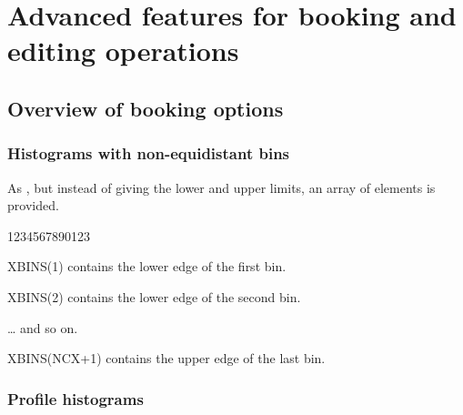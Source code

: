  
\chapter{Advanced features for booking and editing operations}
\label{HEDITING}
 
\section{Overview of booking options}

\subsection{Histograms with non-equidistant bins}
\label{HNONEQUI}

 
\Action As , but instead of giving the lower and upper limits,
        an array  of  elements is provided.
 
\begin{DLttc}{1234567890123}
\item[XBINS(1)] contains the lower edge of the first bin.
\item[XBINS(2)] contains the lower edge of the second bin.
\item[\quad\ldots] and so on.
\item[XBINS(NCX+1)] contains the upper edge of the last bin.
\end{DLttc}
 
\subsection{Profile histograms}
\label{HPROFHIS}

